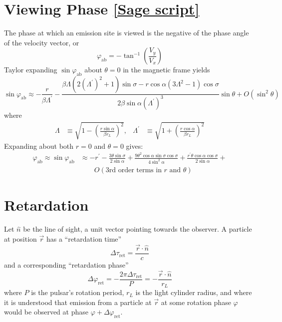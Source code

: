 \documentclass{book}
\newcommand{\phase}{\varphi}
\newcommand{\linktosage}[1]{\hyperref[#1]{[Sage script]}}
\begin{document}
\section{Viewing Phase \linktosage{sage:phase}}

The phase at which an emission site is viewed is the negative of the phase angle of the velocity vector, or
\begin{equation}
    \phase_\text{ab} = -\tan^{-1}\left(\frac{V_y}{V_x}\right)
\end{equation}
Taylor expanding $\sin\phase_\text{ab}$ about $\theta = 0$ in the magnetic frame yields
\begin{equation}
    \sin\phase_\text{ab} \approx
        -\frac{r}{\beta\Lambda^\prime} -
            \frac{\beta\Lambda(2(\Lambda^\prime)^2+1)\sin\sigma - r\cos\alpha(3\Lambda^2-1)\cos\sigma}{
                  2\beta\sin\alpha(\Lambda^\prime)^3}\sin\theta + O(\sin^2\theta)
\end{equation}
where
\begin{align}
    \Lambda &\equiv \sqrt{1-\left(\frac{r\sin\alpha}{\beta r_L}\right)^2}, &
    \Lambda^\prime &\equiv \sqrt{1+\left(\frac{r\cos\alpha}{\beta r_L}\right)^2}
\end{align}
Expanding about both $r = 0$ and $\theta = 0$ gives:
\begin{equation}
    \begin{aligned}
        \phase_\text{ab} \approx \sin\phase_\text{ab} &\approx
            -r^\prime - \frac{3\theta\sin\sigma}{2\sin\alpha} +
            \frac{9\theta^2\cos\alpha\sin\sigma\cos\sigma}{4\sin^2\alpha} +
            \frac{r^\prime\theta\cos\alpha\cos\sigma}{2\sin\alpha} + \\
            &\qquad O(\text{3rd order terms in $r$ and $\theta$})
    \end{aligned}
\end{equation}

\section{Retardation}

Let $\hat{n}$ be the line of sight, a unit vector pointing towards the observer.
A particle at position $\vec{r}$ has a ``retardation time''
\begin{equation}
    \Delta\tau_\text{ret} = \frac{\vec{r}\cdot\hat{n}}{c}
\end{equation}
and a corresponding ``retardation phase''
\begin{equation}
    \Delta\phase_\text{ret} = -\frac{2\pi\Delta\tau_\text{ret}}{P} = -\frac{\vec{r}\cdot\hat{n}}{r_L}
\end{equation}
where $P$ is the pulsar's rotation period, $r_L$ is the light cylinder radius, and where it is understood that emission from a particle at $\vec{r}$ at some rotation phase $\phase$ would be observed at phase $\phase + \Delta\phase_\text{ret}$.
\end{document}
